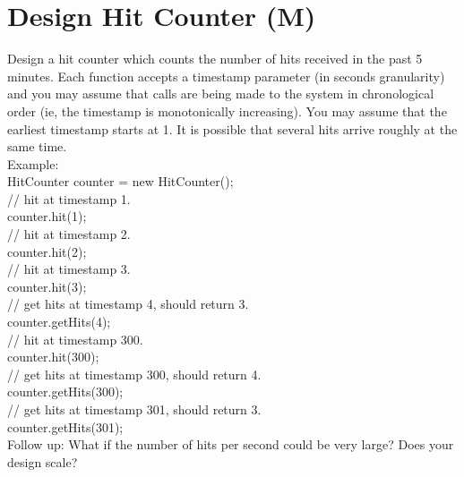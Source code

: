 \section{Design Hit Counter (M)}
Design a hit counter which counts the number of hits received in the past 5 minutes. Each function accepts a timestamp parameter (in seconds granularity) and you may assume that calls are being made to the system in chronological order (ie, the timestamp is monotonically increasing). You may assume that the earliest timestamp starts at 1. It is possible that several hits arrive roughly at the same time.\\

Example:\\
HitCounter counter = new HitCounter();\\

// hit at timestamp 1.\\
counter.hit(1);\\

// hit at timestamp 2.\\
counter.hit(2);\\

// hit at timestamp 3.\\
counter.hit(3);\\

// get hits at timestamp 4, should return 3.\\
counter.getHits(4);\\

// hit at timestamp 300.\\
counter.hit(300);\\

// get hits at timestamp 300, should return 4.\\
counter.getHits(300);\\

// get hits at timestamp 301, should return 3.\\
counter.getHits(301); \\

Follow up: What if the number of hits per second could be very large? Does your design scale? \\

